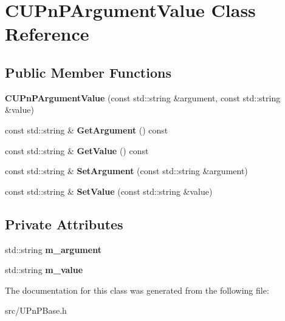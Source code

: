 \section{CUPnPArgumentValue Class Reference}
\label{classCUPnPArgumentValue}
\subsection*{Public Member Functions}
\begin{DoxyCompactItemize}
\item 
{\bfseries CUPnPArgumentValue} (const std::string \&argument, const std::string \&value)\label{classCUPnPArgumentValue_aef5ab5cbe94522a38e7c5b93ee2bcdf6}

\item 
const std::string \& {\bfseries GetArgument} () const \label{classCUPnPArgumentValue_a9907d51221f8becf585f85fa5d8e1169}

\item 
const std::string \& {\bfseries GetValue} () const \label{classCUPnPArgumentValue_a9d5b0340d5748feb97ce3eafc6139e22}

\item 
const std::string \& {\bfseries SetArgument} (const std::string \&argument)\label{classCUPnPArgumentValue_a15e109eb159d3db347d63fd88b422e57}

\item 
const std::string \& {\bfseries SetValue} (const std::string \&value)\label{classCUPnPArgumentValue_a013b22ba7ed7fecdb862843990bfa97f}

\end{DoxyCompactItemize}
\subsection*{Private Attributes}
\begin{DoxyCompactItemize}
\item 
std::string {\bfseries m\_\-argument}\label{classCUPnPArgumentValue_ad907295372d72d42910ae3feb8553b7b}

\item 
std::string {\bfseries m\_\-value}\label{classCUPnPArgumentValue_a8102cfcba84ca1782ce57da1843a323a}

\end{DoxyCompactItemize}


The documentation for this class was generated from the following file:\begin{DoxyCompactItemize}
\item 
src/UPnPBase.h\end{DoxyCompactItemize}
